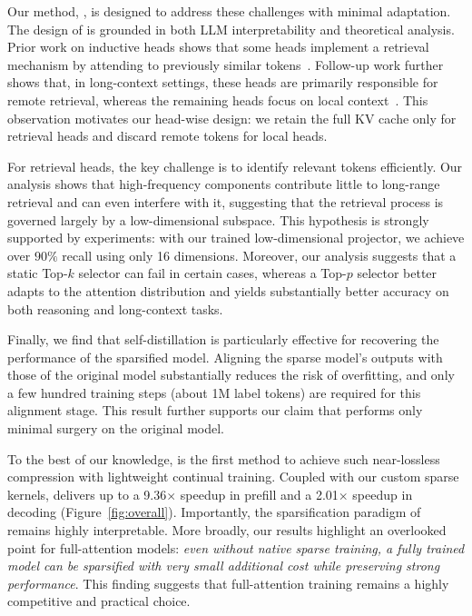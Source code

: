 Our method, \name, is designed to address these challenges with minimal adaptation.
The design of \name is grounded in both LLM interpretability and theoretical analysis. Prior work on inductive heads shows that some heads implement a retrieval mechanism by attending to previously similar tokens~\citep{olsson2022incontextlearninginductionheads}. Follow-up work further shows that, in long-context settings, these heads are primarily responsible for remote retrieval, whereas the remaining heads focus on local context~\citep{razorattn}. This observation motivates our head-wise design: we retain the full KV cache only for retrieval heads and discard remote tokens for local heads.

For retrieval heads, the key challenge is to identify relevant tokens efficiently. Our analysis shows that high-frequency components contribute little to long-range retrieval and can even interfere with it, suggesting that the retrieval process is governed largely by a low-dimensional subspace. This hypothesis is strongly supported by experiments: with our trained low-dimensional projector, we achieve over $90\%$ recall using only 16 dimensions. Moreover, our analysis suggests that a static Top-$k$ selector can fail in certain cases, whereas a Top-$p$ selector better adapts to the attention distribution and yields substantially better accuracy on both reasoning and long-context tasks.

Finally, we find that self-distillation is particularly effective for recovering the performance of the sparsified model. Aligning the sparse model's outputs with those of the original model substantially reduces the risk of overfitting, and only a few hundred training steps (about 1M label tokens) are required for this alignment stage. This result further supports our claim that \name performs only minimal surgery on the original model.

To the best of our knowledge, \name is the first method to achieve such near-lossless compression with lightweight continual training. Coupled with our custom sparse kernels, \name delivers up to a 9.36$\times$ speedup in prefill and a 2.01$\times$ speedup in decoding (Figure~\ref{fig:overall}). Importantly, the sparsification paradigm of \name remains highly interpretable. More broadly, our results highlight an overlooked point for full-attention models: \textit{even without native sparse training, a fully trained model can be sparsified with very small additional cost while preserving strong performance}. This finding suggests that full-attention training remains a highly competitive and practical choice.



